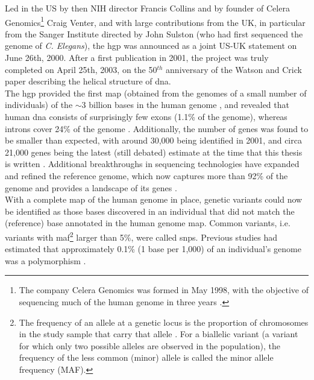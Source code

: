Led in the US by then NIH director Francis Collins and by founder of Celera Genomics\footnote{The company Celera Genomics was formed in May 1998, with the objective of sequencing much of the human genome in three years
\cite{venter1998shotgun}.} 
Craig Venter, and with large contributions from the UK, in particular from the Sanger Institute directed by John Sulston (who had first sequenced the genome of \textit{C. Elegans}), the \gls{hgp} was announced as a joint US-UK statement on June 26th, 2000.
After a first publication in 2001, the project was truly completed on April 25th, 2003, on the 50$^{th}$ anniversary of the Watson and Crick paper describing the helical structure of \gls{dna}.\\

The \gls{hgp} provided the first map (obtained from the genomes of a small number of individuals) of the $\sim$3 billion bases in the human genome \cite{lander2001initial, schmutz2004quality, hattori2005finishing}, and revealed that human \gls{dna} consists of surprisingly few exons (1.1\% of the genome), whereas introns cover 24\% of the genome \cite{venter2001sequence, lander2001initial}. 
Additionally, the number of genes was found to be smaller than expected, with around 30,000 being identified in 2001, and circa 21,000 genes being the latest (still debated) estimate at the time that this thesis is written \cite{pertea2018thousands}. 
Additional breakthroughs in sequencing technologies have expanded and refined the reference genome, which now captures more than 92\% of the genome and provides a landscape of its 
genes \cite{lander2011initial}.\\

With a complete map of the human genome in place, genetic variants could now be identified as those bases discovered in an individual that did not match the (reference) base annotated in the human genome map. 
Common variants, i.e. variants with \gls{maf}\footnote{The frequency of an
allele at a genetic locus is the proportion of chromosomes in the study sample that carry that allele \cite{laird2010fundamentals}. 
For a biallelic variant (a variant for which only two possible alleles are observed in the population), the frequency of the less common (minor) allele is called the minor allele frequency (MAF).} larger than 5\%, were called \glspl{snp}. 
Previous studies had estimated that approximately 0.1\% (1 base per 1,000) of an individual's genome was a polymorphism \cite{wang1998large, li1991low, cargill1999characterization}. 

